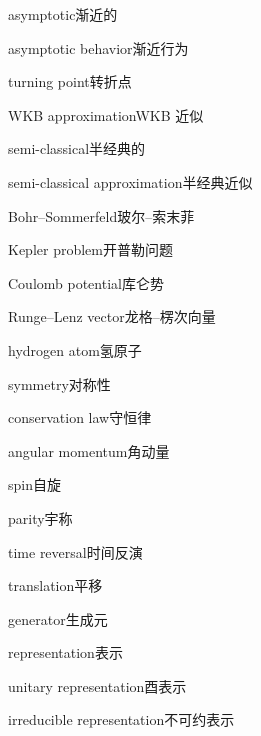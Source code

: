 \begin{multicols}{2}
asymptotic\hspace{0.9em}渐近的\par
asymptotic behavior\hspace{0.9em}渐近行为\par
turning point\hspace{0.9em}转折点\par
WKB approximation\hspace{0.9em}WKB 近似\par
semi-classical\hspace{0.9em}半经典的\par
semi-classical approximation\hspace{0.9em}半经典近似\par
Bohr–Sommerfeld\hspace{0.9em}玻尔–索末菲\par
Kepler problem\hspace{0.9em}开普勒问题\par
Coulomb potential\hspace{0.9em}库仑势\par
Runge–Lenz vector\hspace{0.9em}龙格–楞次向量\par
hydrogen atom\hspace{0.9em}氢原子\par
symmetry\hspace{0.9em}对称性\par
conservation law\hspace{0.9em}守恒律\par
angular momentum\hspace{0.9em}角动量\par
spin\hspace{0.9em}自旋\par
parity\hspace{0.9em}宇称\par
time reversal\hspace{0.9em}时间反演\par
translation\hspace{0.9em}平移\par
generator\hspace{0.9em}生成元\par
representation\hspace{0.9em}表示\par
unitary representation\hspace{0.9em}酉表示\par
irreducible representation\hspace{0.9em}不可约表示\par

\end{multicols}

